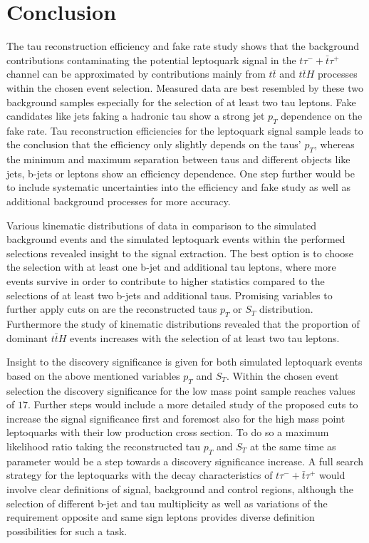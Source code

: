 \chapter{Conclusion}
The tau reconstruction efficiency and fake rate study shows that the background contributions contaminating the potential leptoquark signal in the $t\tau^{-}+\bar{t}\tau^{+}$ channel can be approximated by contributions mainly from $t\bar{t}$ and $t\bar{t}H$ processes within the chosen event selection. Measured data are best resembled by these two background samples especially for the selection of at least two tau leptons. Fake candidates like jets faking a hadronic tau show a strong jet $p_T$ dependence on the fake rate. Tau reconstruction efficiencies for the leptoquark signal sample leads to the conclusion that the efficiency only slightly depends on the taus' $p_T$, whereas the minimum and maximum separation between taus and different objects like jets, b-jets or leptons show an efficiency dependence. One step further would be to include systematic uncertainties into the efficiency and fake study as well as additional background processes for more accuracy.\par
Various kinematic distributions of data in comparison to the simulated background events and the simulated leptoquark events within the performed selections revealed insight to the signal extraction. The best option is to choose the selection with at least one b-jet and additional tau leptons, where more events survive in order to contribute to higher statistics compared to the selections of at least two b-jets and additional taus. Promising variables to further apply cuts on are the reconstructed taus $p_T$ or $S_T$ distribution. Furthermore the study of kinematic distributions revealed that the proportion of dominant $t\bar{t}H$ events increases with the selection of at least two tau leptons.\par
Insight to the discovery significance is given for both simulated leptoquark events based on the above mentioned variables $p_T$ and $S_T$. Within the chosen event selection the discovery significance for the low mass point sample reaches values of $17$. Further steps would include a more detailed study of the proposed cuts to increase the signal significance first and foremost also for the high mass point leptoquarks with their low production cross section. To do so a maximum likelihood ratio taking the reconstructed tau $p_T$ and $S_T$ at the same time as parameter would be a step towards a discovery significance increase. A full search strategy for the leptoquarks with the decay characteristics of $t\tau^{-}+\bar{t}\tau^{+}$ would involve clear definitions of signal, background and control regions, although the selection of different b-jet and tau multiplicity as well as variations of the requirement opposite and same sign leptons provides diverse definition possibilities for such a task.

